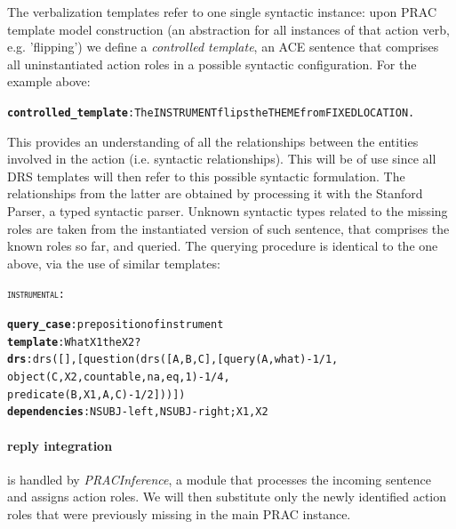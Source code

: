 \documentclass[oribibl]{llncs}
\begin{document}
The verbalization templates refer to one single syntactic instance: upon PRAC template model construction (an abstraction for all instances of that action verb, e.g. 'flipping') we define a \textit{controlled template}, an ACE sentence that comprises all uninstantiated action roles in a possible syntactic configuration.
For the example above:
{\small
\begin{alltt}
\textbf{controlled_template}: The INSTRUMENT flips the THEME from FIXEDLOCATION. 
\end{alltt}
}%
This provides an understanding of all the relationships between the entities involved in the action (i.e. syntactic relationships).
This will be of use since all DRS templates will then refer to this possible syntactic formulation. The relationships from the latter are obtained by processing it with the Stanford Parser\cite{mcdm08b}, a typed syntactic parser.
Unknown syntactic types related to the missing roles are taken from the instantiated version of such sentence, that comprises the known roles so far, and queried.
The querying procedure is identical to the one above, via the use of similar templates:

\begin{alltt}
{\large \textsc{instrumental}}:

        \textbf{query_case}: preposition of instrument
        \textbf{template}: What X1 the X2?
        \textbf{drs}: drs([],[question(drs([A,B,C],[query(A,what)-1/1,
        object(C,X2,countable,na,eq,1)-1/4,
        predicate(B,X1,A,C)-1/2]))])
        \textbf{dependencies}: NSUBJ-left, NSUBJ-right; X1, X2
\end{alltt}




\paragraph{reply integration} is handled by \textit{PRACInference}, a module that processes the incoming sentence and assigns action roles. We will then substitute only the newly identified action roles that were previously missing in the main PRAC instance.
\end{document}
